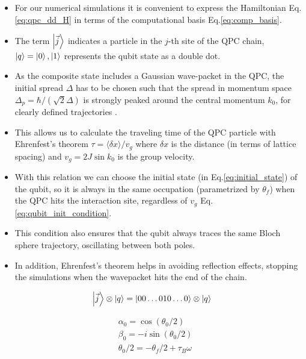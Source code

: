 \documentclass[10pt,
 amsmath,amssymb,
 aps,prb, twocolumn
]{revtex4-2}
\begin{document}
\begin{itemize}
    \item For our numerical simulations it is convenient to express the Hamiltonian Eq.\eqref{eq:qpc_dd_H} in terms of the computational basis Eq.\eqref{eq:comp_basis}.
    \item The term $\ket{\vec{j}}$ indicates a particle in the $j$-th site of the QPC chain, $\ket{q}=\ket{0},\ket{1}$ represents the qubit state as a double dot.
    \item As the composite state includes a Gaussian wave-packet in the QPC, the initial spread $\Delta$ has to be chosen such that the spread in momentum space $\Delta_p = \hbar/(\sqrt{2}\Delta)$ is strongly peaked around the central momentum $k_0$, for clearly defined trajectories \cite{shankar1994}. 
    \item This allows us to calculate the traveling time of the QPC particle with Ehrenfest's theorem $\tau = \langle \delta x \rangle/v_g$ where $\delta x$ is the distance (in terms of lattice spacing) and $v_g = 2J\sin{k_0}$ is the group velocity.
    \item With this relation we can choose the initial state (in Eq.\eqref{eq:initial_state}) of the qubit, so it is always in the same occupation (parametrized by $\theta_f$) when the QPC hits the interaction site, regardless of $v_g$ Eq.\eqref{eq:qubit_init_condition}.
    \item This condition also ensures that the qubit always traces the same Bloch sphere trajectory, oscillating between both poles.
    \item  In addition, Ehrenfest's theorem helps in avoiding reflection effects, stopping the simulations when the wavepacket hits the end of the chain.

\end{itemize}

\begin{align}\label{eq:comp_basis}
    \ket{\vec{j}}\otimes \ket{q} = \ket{0 0 \dots 010 \dots 0}\otimes \ket{q}
\end{align}

\begin{align}\label{eq:qubit_init_condition}
    & \alpha_0 = \cos(\theta_0/2)  \\
    & \beta_0 = -i\sin(\theta_0/2) \\
    & \theta_0/2 = -\theta_f/2 + \tau_B \omega \\
\end{align}
\end{document}
